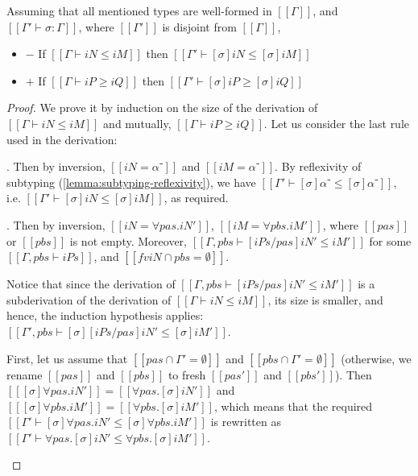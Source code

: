\begin{lemma}
  \label{lemma:subst-pres-subt}
  Assuming that all mentioned types are well-formed in $[[Γ]]$,
  and $[[Γ' ⊢ σ : Γ]]$, where $[[Γ']]$ is disjoint from $[[Γ]]$,
  \begin{itemize}
    \item $-$ If $[[Γ ⊢ iN ≤ iM]]$ then $[[Γ' ⊢ [σ]iN ≤ [σ]iM]]$
    \item $+$ If $[[Γ ⊢ iP ≥ iQ]]$ then $[[Γ' ⊢ [σ]iP ≥ [σ]iQ]]$
  \end{itemize}
\end{lemma}
\begin{proof}
  We prove it by induction on the size of the derivation of $[[Γ ⊢ iN ≤ iM]]$
  and mutually, $[[Γ ⊢ iP ≥ iQ]]$. Let us consider the last rule 
  used in the derivation:
  \begin{caseof}
    \item {}. Then by inversion, 
      $[[iN = α⁻]]$ and $[[iM = α⁻]]$. By reflexivity of subtyping
      (\cref{lemma:subtyping-reflexivity}),
      we have $[[Γ' ⊢ [σ]α⁻ ≤ [σ]α⁻]]$, i.e. $[[Γ' ⊢ [σ]iN ≤ [σ]iM]]$,
      as required.
    \item  {}. Then by inversion,
      $[[iN = ∀pas.iN']]$, $[[iM = ∀pbs.iM']]$, where $[[pas]]$ or $[[pbs]]$ is not empty.
      Moreover, $[[Γ,pbs ⊢ [iPs/pas]iN' ≤ iM']]$ for some $[[Γ, pbs ⊢ iPs]]$, and 
      $[[fv iN ∩ {pbs} = ∅ ]]$.

      Notice that since the derivation of $[[Γ,pbs ⊢ [iPs/pas]iN' ≤ iM']]$ is
      a subderivation of the derivation of $[[Γ ⊢ iN ≤ iM]]$, its size is smaller, 
      and hence, the induction hypothesis applies:
      $[[Γ', pbs ⊢ [σ][iPs/pas]iN' ≤ [σ]iM']]$.

      First, let us assume that $[[{pas} ∩ {Γ'} = ∅]]$ and $[[{pbs} ∩ {Γ'} = ∅]]$
      (otherwise, we rename $[[pas]]$ and $[[pbs]]$ to fresh $[[pas']]$ and $[[pbs']]$).
      Then $[[ [σ]∀pas.iN' ]] = [[ ∀pas.[σ]iN' ]]$ and $[[ [σ]∀pbs.iM' ]] = [[ ∀pbs.[σ]iM' ]]$, 
      which means that the required $[[Γ' ⊢ [σ]∀pas.iN' ≤ [σ]∀pbs.iM']]$ is rewritten as
      $[[Γ' ⊢ ∀pas.[σ]iN' ≤ ∀pbs.[σ]iM']]$.


\end{caseof}
\end{proof}
